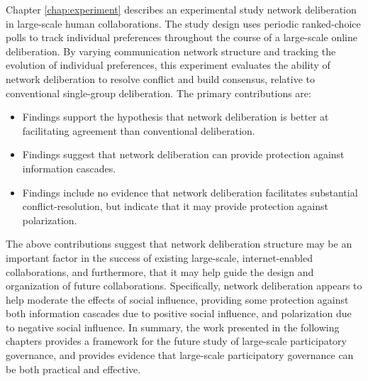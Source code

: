 Chapter \ref{chap:experiment} describes an experimental study network deliberation in large-scale human collaborations.
The study design uses periodic ranked-choice polls to track individual preferences
throughout the course of a large-scale online deliberation.
By varying communication network structure and tracking the evolution of individual
preferences,
this experiment evaluates the ability of network deliberation to resolve conflict
and build consensus, relative to conventional single-group deliberation.
The primary contributions are:
\begin{itemize}
\setlength\itemsep{0pt}
    \item Findings support the hypothesis that network deliberation is better at facilitating agreement than conventional deliberation.
    \item Findings suggest that network deliberation can provide protection against information cascades.
    \item Findings include no evidence that network deliberation facilitates substantial conflict-resolution, but indicate that it may provide protection against polarization.
\end{itemize}

The above contributions suggest that network deliberation structure may be an important factor in the
success of existing large-scale, internet-enabled collaborations, and furthermore,
that it may help guide the design and organization of future collaborations.
Specifically, network deliberation appears to help moderate the effects of social influence,
providing some protection against both information cascades due to positive social influence,
and polarization due to negative social influence.
In summary, the work presented in the following chapters provides a framework for the
future study of large-scale participatory governance,
and provides evidence that large-scale participatory governance can be both practical and effective.